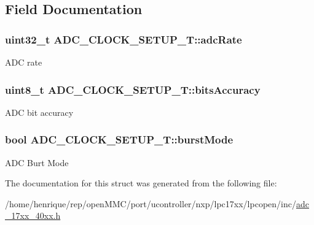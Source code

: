 \subsection{Field Documentation}
\hypertarget{structADC__CLOCK__SETUP__T_a8948fd266d15eee3d090cab24a64ff42}{
\subsubsection[{adc\-Rate}]{\setlength{\rightskip}{0pt plus 5cm}uint32\-\_\-t A\-D\-C\-\_\-\-C\-L\-O\-C\-K\-\_\-\-S\-E\-T\-U\-P\-\_\-\-T\-::adc\-Rate}}\label{structADC__CLOCK__SETUP__T_a8948fd266d15eee3d090cab24a64ff42}
A\-D\-C rate \hypertarget{structADC__CLOCK__SETUP__T_aeb37891571691033d98087dabf6ddbd5}{
\subsubsection[{bits\-Accuracy}]{\setlength{\rightskip}{0pt plus 5cm}uint8\-\_\-t A\-D\-C\-\_\-\-C\-L\-O\-C\-K\-\_\-\-S\-E\-T\-U\-P\-\_\-\-T\-::bits\-Accuracy}}\label{structADC__CLOCK__SETUP__T_aeb37891571691033d98087dabf6ddbd5}
A\-D\-C bit accuracy \hypertarget{structADC__CLOCK__SETUP__T_a92bc50d4472a36de38dac15a5fd3109a}{
\subsubsection[{burst\-Mode}]{\setlength{\rightskip}{0pt plus 5cm}bool A\-D\-C\-\_\-\-C\-L\-O\-C\-K\-\_\-\-S\-E\-T\-U\-P\-\_\-\-T\-::burst\-Mode}}\label{structADC__CLOCK__SETUP__T_a92bc50d4472a36de38dac15a5fd3109a}
A\-D\-C Burt Mode 

The documentation for this struct was generated from the following file\-:\begin{DoxyCompactItemize}
\item 
/home/henrique/rep/open\-M\-M\-C/port/ucontroller/nxp/lpc17xx/lpcopen/inc/\hyperlink{adc__17xx__40xx_8h}{adc\-\_\-17xx\-\_\-40xx.\-h}\end{DoxyCompactItemize}
